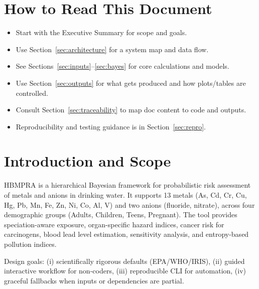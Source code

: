 \documentclass[11pt,a4paper]{article}
\begin{document}
\section{How to Read This Document}
\begin{itemize}
  \item Start with the Executive Summary for scope and goals.
  \item Use Section~\ref{sec:architecture} for a system map and data flow.
  \item See Sections~\ref{sec:inputs}--\ref{sec:bayes} for core calculations and models.
  \item Use Section~\ref{sec:outputs} for what gets produced and how plots/tables are controlled.
  \item Consult Section~\ref{sec:traceability} to map doc content to code and outputs.
  \item Reproducibility and testing guidance is in Section~\ref{sec:repro}.
\end{itemize}

\section{Introduction and Scope}
HBMPRA is a hierarchical Bayesian framework for probabilistic risk assessment of metals and anions in drinking water. It supports 13 metals (As, Cd, Cr, Cu, Hg, Pb, Mn, Fe, Zn, Ni, Co, Al, V) and two anions (fluoride, nitrate), across four demographic groups (Adults, Children, Teens, Pregnant). The tool provides speciation-aware exposure, organ-specific hazard indices, cancer risk for carcinogens, blood lead level estimation, sensitivity analysis, and entropy-based pollution indices.

Design goals: (i) scientifically rigorous defaults (EPA/WHO/IRIS), (ii) guided interactive workflow for non-coders, (iii) reproducible CLI for automation, (iv) graceful fallbacks when inputs or dependencies are partial.
\end{document}
